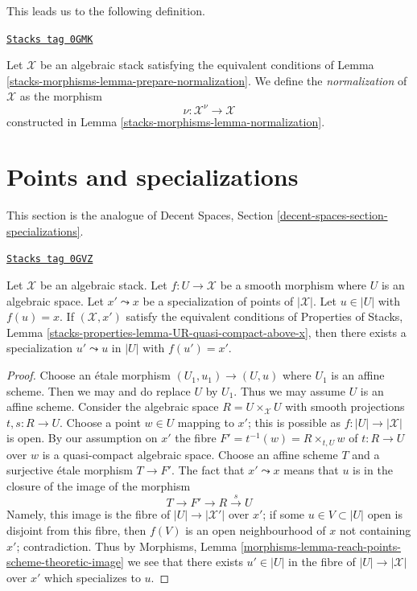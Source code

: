 This leads us to the following definition.

\begin{definition}[Normalization]
\label{stacks-morphisms-definition-normalization}
\href{https://stacks.math.columbia.edu/tag/0GMK}{\texttt{Stacks tag 0GMK}}

Let $\mathcal{X}$ be an algebraic stack satisfying the
equivalent conditions of Lemma \ref{stacks-morphisms-lemma-prepare-normalization}.
We define the {\it normalization} of $\mathcal{X}$ as the morphism
$$
\nu : \mathcal{X}^\nu \longrightarrow \mathcal{X}
$$
constructed in Lemma \ref{stacks-morphisms-lemma-normalization}.
\end{definition}

\section{Points and specializations}
\label{stacks-morphisms-section-specializations}
This section is the analogue of
Decent Spaces, Section \ref{decent-spaces-section-specializations}.

\begin{lemma}[Specialization]
\label{stacks-morphisms-lemma-specialization}
\href{https://stacks.math.columbia.edu/tag/0GVZ}{\texttt{Stacks tag 0GVZ}}

Let $\mathcal{X}$ be an algebraic stack. Let $f : U \to \mathcal{X}$
be a smooth morphism where $U$ is an algebraic space. Let
$x' \leadsto x$ be a specialization of points of $|\mathcal{X}|$.
Let $u \in |U|$ with $f(u) = x$. If $(\mathcal{X}, x')$ satisfy the
equivalent conditions of Properties of Stacks,
Lemma \ref{stacks-properties-lemma-UR-quasi-compact-above-x},
then there exists a specialization
$u' \leadsto u$ in $|U|$ with $f(u') = x'$.
\end{lemma}

\begin{proof}
Choose an \'etale morphism $(U_1, u_1) \to (U, u)$ where $U_1$
is an affine scheme. Then we may and do replace $U$ by $U_1$.
Thus we may assume $U$ is an affine scheme.
Consider the algebraic space $R = U \times_\mathcal{X} U$
with smooth projections $t, s : R \to U$.
Choose a point $w \in U$ mapping to $x'$; this is possible as
$f : |U| \to |\mathcal{X}|$ is open.
By our assumption on $x'$ the fibre
$F' = t^{-1}(w) = R \times_{t, U} w$
of $t : R \to U$ over $w$ is a quasi-compact algebraic space.
Choose an affine scheme $T$ and a surjective \'etale morphism
$T \to F'$. The fact that $x' \leadsto x$ means that $u$ is in
the closure of the image of the morphism
$$
T \to F' \to R \xrightarrow{s} U
$$
Namely, this image is the fibre of $|U| \to |\mathcal{X}'|$
over $x'$; if some $u \in V \subset |U|$ open is disjoint
from this fibre, then $f(V)$ is an open neighbourhood of $x$
not containing $x'$; contradiction.
Thus by Morphisms, Lemma
\ref{morphisms-lemma-reach-points-scheme-theoretic-image}
we see that  there exists $u' \in |U|$ in the fibre
of $|U| \to |\mathcal{X}|$ over $x'$ which specializes to $u$.
\end{proof}

